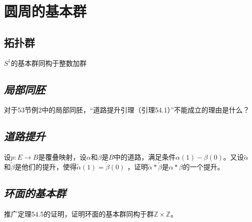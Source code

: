\section{圆周的基本群}

\subsection*{拓扑群}

\begin{mdframed}
    \begin{theorem}
        $S^1$的基本群同构于整数加群
    \end{theorem}
\end{mdframed}

\subsection*{\textsl{局部同胚}}

\begin{mdframed}
    \begin{question}
        对于53节例2中的局部同胚，“道路提升引理（引理54.1）”不能成立的理由是什么？
    \end{question}
\end{mdframed}

\subsection*{\textsl{道路提升}}

\begin{mdframed}
    \begin{question}
        设$p:E\rightarrow B$是覆叠映射，设$\alpha$和$\beta$是$B$中的道路，满足条件$\alpha(1)-\beta(0)$。又设$\tilde{\alpha}$和$\tilde{\beta}$是他们的提升，使得$\tilde{\alpha}(1)=\tilde{\beta}(0)$
        ，证明$\tilde{\alpha}*\tilde{\beta}$是$\alpha*\beta$的一个提升。
    \end{question}
\end{mdframed}

\subsection*{\textsl{环面的基本群}}

\begin{mdframed}
    \begin{question}
        推广定理54.5的证明，证明环面的基本群同构于群$\mathbb{Z}\times \mathbb{Z}$。
    \end{question}
\end{mdframed}

